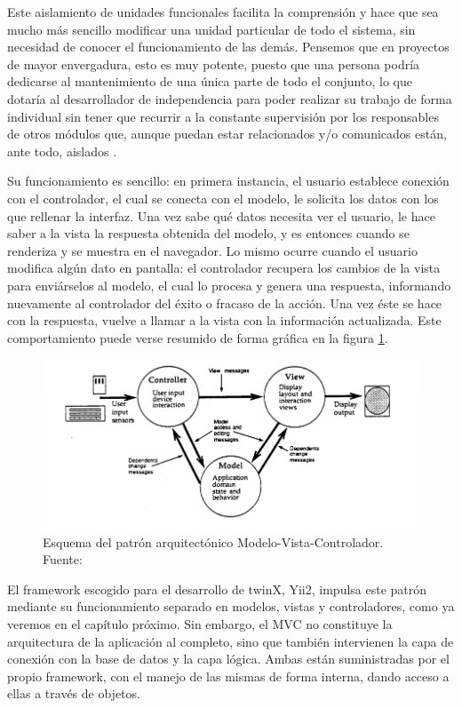 Este aislamiento de unidades funcionales facilita la comprensión y hace que sea mucho más sencillo modificar una unidad particular de todo el sistema, sin necesidad de conocer el funcionamiento de las demás. Pensemos que en proyectos de mayor envergadura, esto es muy potente, puesto que una persona podría dedicarse al mantenimiento de una única parte de todo el conjunto, lo que dotaría al desarrollador de independencia para poder realizar su trabajo de forma individual sin tener que recurrir a la constante supervisión por los responsables de otros módulos que, aunque puedan estar relacionados y/o comunicados están, ante todo, aislados \cite{krasner88}.

Su funcionamiento es sencillo: en primera instancia, el usuario establece conexión con el controlador, el cual se conecta con el modelo, le solicita los datos con los que rellenar la interfaz. Una vez sabe qué datos necesita ver el usuario, le hace saber a la vista la respuesta obtenida del modelo, y es entonces cuando se renderiza y se muestra en el navegador. Lo mismo ocurre cuando el usuario modifica algún dato en pantalla: el controlador recupera los cambios de la vista para enviárselos al modelo, el cual lo procesa y genera una respuesta, informando nuevamente al controlador del éxito o fracaso de la acción. Una vez éste se hace con la respuesta, vuelve a llamar a la vista con la información actualizada. Este comportamiento puede verse resumido de forma gráfica en la figura \ref{fig:mvc}.

\begin{figure}
	\centering
	\includegraphics[width=\textwidth]{img/mvc}
	\caption[Esquema MVC]{Esquema del patrón arquitectónico Modelo-Vista-Controlador. Fuente: \cite{krasner88}}
	\label{fig:mvc}
\end{figure}


El framework escogido para el desarrollo de twinX, Yii2, impulsa este patrón mediante su funcionamiento separado en modelos, vistas y controladores, como ya veremos en el capítulo próximo. Sin embargo, el MVC no constituye la arquitectura de la aplicación al completo, sino que también intervienen la capa de conexión con la base de datos y la capa lógica. Ambas están suministradas por el propio framework, con el manejo de las mismas de forma interna, dando acceso a ellas a través de objetos.